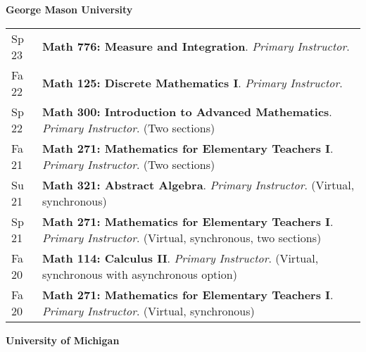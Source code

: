 
    \medskip


    \medskip
    \medskip



    \textbf{\large George Mason University}
    
    \begin{center}
    {
    \renewcommand{\arraystretch}{1.2}
    \begin{longtable}{p{}  p{}}
      Sp 23 & \textbf{{\normalfont Math 776:} Measure and Integration}. \textit{Primary Instructor}.  \\ 
  Fa 22 & \textbf{{\normalfont Math 125:} Discrete Mathematics I}. \textit{Primary Instructor}.  \\ 
  Sp 22 & \textbf{{\normalfont Math 300:} Introduction to Advanced Mathematics}. \textit{Primary Instructor}. (Two sections) \\ 
  Fa 21 & \textbf{{\normalfont Math 271:} Mathematics for Elementary Teachers I}. \textit{Primary Instructor}. (Two sections) \\ 
  Su 21 & \textbf{{\normalfont Math 321:} Abstract Algebra}. \textit{Primary Instructor}. (Virtual, synchronous) \\ 
  Sp 21 & \textbf{{\normalfont Math 271:} Mathematics for Elementary Teachers I}. \textit{Primary Instructor}. (Virtual, synchronous, two sections) \\ 
  Fa 20 & \textbf{{\normalfont Math 114:} Calculus II}. \textit{Primary Instructor}. (Virtual, synchronous with asynchronous option) \\ 
  Fa 20 & \textbf{{\normalfont Math 271:} Mathematics for Elementary Teachers I}. \textit{Primary Instructor}. (Virtual, synchronous) 
    \end{longtable}
    } 
    \end{center}

    \vspace{-1em}
    

    \textbf{\large University of Michigan}
    

